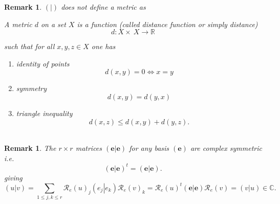 \documentclass[aps,preprint]{revtex4}%
\newtheorem{remark}[theorem]{Remark}
\begin{document}
\begin{remark}
$\left(  \left.  {}\right\vert \right)  $ \emph{does not} define a metric as

A metric $d$ on a set $X$ is a function (called distance function or simply
distance)%
\begin{equation}
d:X\times\ X\rightarrow\mathbb{R}%
\end{equation}


such that for all $x,y,z\in X$ one has

\begin{enumerate}
\item identity of points%
\begin{equation}
d(x,y)=0\Longleftrightarrow x=y
\end{equation}


\item symmetry%
\begin{equation}
d(x,y)=d(y,x)
\end{equation}


\item triangle inequality%
\begin{equation}
d(x,z)\leq d(x,y)+d(y,z).
\end{equation}
\qquad\qquad\ \qquad
\end{enumerate}
\end{remark}

\begin{remark}
The $r\times r$ \emph{matrices} $\left(  \left.  \mathbf{e}\right\vert
\mathbf{e}\right)  $ for any basis $\left(  \mathbf{e}\right)  $ are complex
symmetric i.e.
\begin{equation}
\left(  \left.  \mathbf{e}\right\vert \mathbf{e}\right)  ^{t}=\left(  \left.
\mathbf{e}\right\vert \mathbf{e}\right)  .
\end{equation}
giving%
\begin{equation}
\left(  \left.  u\right\vert v\right)  =\sum_{1\leq j,k\leq r}\mathcal{R}%
_{e}\left(  u\right)  _{j}\left(  \left.  e_{j}\right\vert e_{k}\right)
\mathcal{R}_{e}\left(  v\right)  _{k}=\mathcal{R}_{e}\left(  u\right)
^{t}\left(  \left.  \mathbf{e}\right\vert \mathbf{e}\right)  \mathcal{R}%
_{e}\left(  v\right)  =\left(  \left.  v\right\vert u\right)  \in\mathbb{C}.
\end{equation}

\end{remark}
\end{document}
